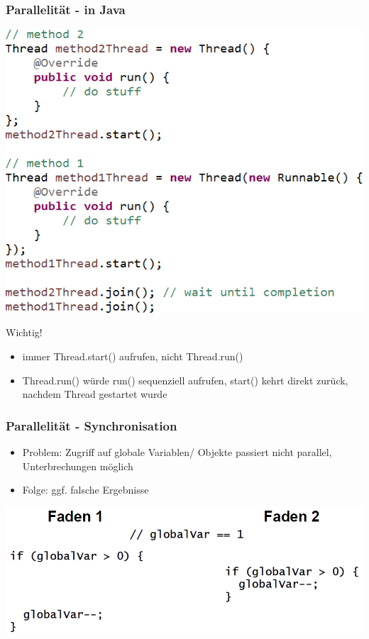 \documentclass[18pt]{beamer}
\begin{document}
	\begin{frame}
		\frametitle{Parallelität - in Java}
		\centering
		\includegraphics[scale=0.43]{./pics/tut5/crea-thr-java.png}
		\pause
		\begin{alertblock}{Wichtig!}
			\begin{itemize}
				\item immer Thread.start() aufrufen, nicht Thread.run() \pause
				\item Thread.run() würde run() sequenziell aufrufen, start() kehrt direkt zurück, nachdem Thread gestartet wurde
			\end{itemize}
		\end{alertblock}
	\end{frame}

	\begin{frame}
		\frametitle{Parallelität - Synchronisation}
		\begin{itemize}
			\item Problem: Zugriff auf globale Variablen/ Objekte passiert nicht parallel, Unterbrechungen möglich
			\item Folge: ggf. falsche Ergebnisse
		\end{itemize}
		\includegraphics[scale=0.43]{./pics/tut5/par-pro.png}
	\end{frame}
\end{document}
